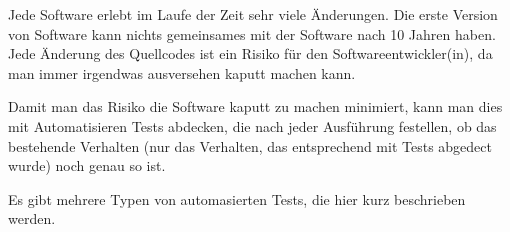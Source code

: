 

Jede Software erlebt im Laufe der Zeit sehr viele Änderungen. 
Die erste Version von Software kann nichts gemeinsames mit der Software nach 10 Jahren haben.
Jede Änderung des Quellcodes ist ein Risiko für den Softwareentwickler(in), da man immer irgendwas ausversehen kaputt machen kann.

Damit man das Risiko die Software kaputt zu machen minimiert, kann man dies mit Automatisieren Tests abdecken, die nach jeder Ausführung festellen, ob das bestehende Verhalten (nur das Verhalten, 
das entsprechend mit Tests abgedect wurde) noch genau so ist.

Es gibt mehrere Typen von automasierten Tests, die hier kurz beschrieben werden.

